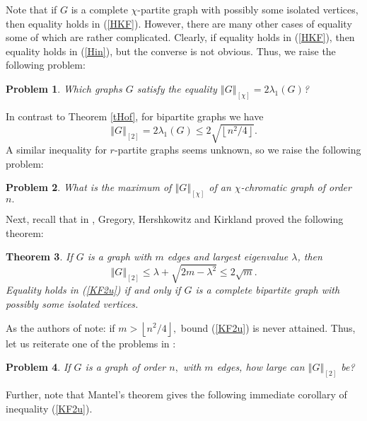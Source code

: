 \documentclass[12pt]{article}%
\newtheorem{theorem}{Theorem}[section]
\newtheorem{problem}[theorem]{Problem}
\begin{document}
Note that if $G$ is a complete $\chi$-partite graph with possibly some
isolated vertices, then equality holds in (\ref{HKF}). However, there are many
other cases of equality some of which are rather complicated. Clearly, if
equality holds in (\ref{HKF}), then equality holds in (\ref{Hin}), but the
converse is not obvious. Thus, we raise the following problem:

\begin{problem}
Which graphs $G$ satisfy the equality $\left\Vert G\right\Vert _{\left[
\chi\right]  }=2\lambda_{1}\left(  G\right)  $?
\end{problem}

In contrast to Theorem \ref{tHof}, for bipartite graphs we have
\[
\left\Vert G\right\Vert _{\left[  2\right]  }=2\lambda_{1}\left(  G\right)
\leq2\sqrt{\left\lfloor n^{2}/4\right\rfloor }.
\]
A similar inequality for $r$-partite graphs seems unknown, so we raise the
following problem:

\begin{problem}
What is the maximum of $\left\Vert G\right\Vert _{\left[  \chi\right]  }$ of
an $\chi$-chromatic graph of order $n.$
\end{problem}

Next, recall that in \cite{GHK01}, Gregory, Hershkowitz and Kirkland proved
the following theorem:

\begin{theorem}
\label{tTfree}If $G$ is a graph with $m$ edges and largest eigenvalue
$\lambda$, then%
\begin{equation}
\left\Vert G\right\Vert _{\left[  2\right]  }\leq\lambda+\sqrt{2m-\lambda^{2}%
}\leq2\sqrt{m}. \label{KF2u}%
\end{equation}
Equality holds in (\ref{KF2u}) if and only if $G$ is a complete bipartite
graph with possibly some isolated vertices.
\end{theorem}

As the authors of \cite{GHK01} note: if $m>\left\lfloor n^{2}/4\right\rfloor
,$ bound (\ref{KF2u}) is never attained. Thus, let us reiterate one of the
problems in \cite{GHK01}:

\begin{problem}
If $G$ is a graph of order $n,$ with $m$ edges, how large can $\left\Vert
G\right\Vert _{\left[  2\right]  }$ be?
\end{problem}

Further, note that Mantel's theorem \cite{Man07} gives the following immediate
corollary of inequality (\ref{KF2u}).
\end{document}
